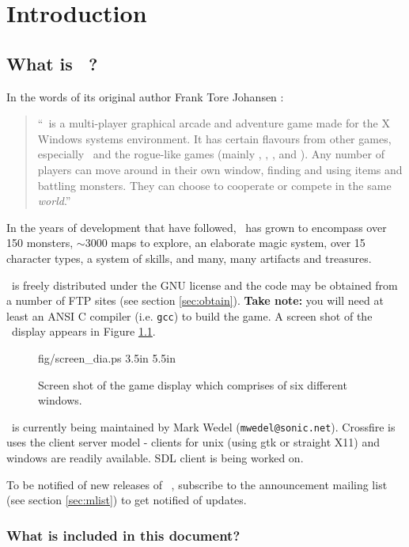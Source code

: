
\chapter{Introduction}

\section{What is \cf\ ? }

In the words of its original author Frank Tore Johansen :
\begin{quote}
``\cf\ is a multi-player graphical arcade and adventure game made for the
X Windows systems environment. It has certain flavours from other games,
especially \gauntlet\ and the rogue-like  games (mainly \hack , \moria ,
\angband , and \ragnarok ). Any number of players can move around in their
own window, finding and using items and battling monsters. They can
choose to cooperate or compete in the same {\em world}.''
\end{quote}
In the years of development that have followed, \cf\ has grown to
encompass over 150 monsters, $\sim$3000 maps to explore, an elaborate
magic system, over 15 character types, a system of skills, and
many, many artifacts and treasures.

\cf\ is freely distributed under the GNU license and the code may be
obtained from a number of FTP sites (see section \ref{sec:obtain}).
{\bf Take note:} you will need at least an ANSI C compiler (i.e. {\tt gcc})
to build the game. A screen shot of the \cf\ display appears in Figure \ref{fig:dis}.

\begin{figure}
\mongovaryboth fig/screen_dia.ps 3.5in 5.5in
\caption{Screen shot of the game display which comprises of six
different windows. \label{fig:dis}}
\end{figure}

\cf\ is currently being maintained by Mark Wedel ({\tt mwedel@sonic.net}).
Crossfire is uses the client server model - clients for unix (using
gtk or straight X11) and windows are readily available.  SDL client
is being worked on.

To be notified of new releases of \cf\ ,
subscribe to the announcement mailing list
(see section \ref{sec:mlist}) to get notified of updates.

\subsection{What is included in this document?}

